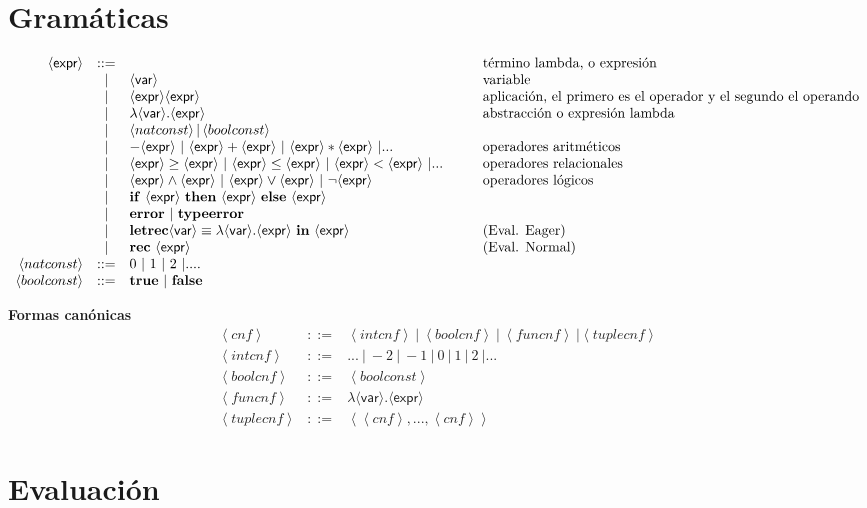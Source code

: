 \documentclass[12pt,a4paper]{article}
\newcommand{\nonterminal}[1]{\langle \mathsf{#1} \rangle}
\newcommand{\expr}{\nonterminal{expr}}
\newcommand{\var}{\nonterminal{var}}
\newcommand{\la}{\left\langle }
\newcommand{\ra}{\right\rangle }
\newcommand{\cnf}{\left\langle cnf\right\rangle}
\newcommand{\ife}{\mathbf{if}\ }
\newcommand{\thene}{\ \mathbf{then}\ }
\newcommand{\elsee}{\ \mathbf{else}\ }
\newcommand{\natconst}{\left\langle natconst\right\rangle}
\newcommand{\boolconst}{\left\langle boolconst\right\rangle}
\newcommand{\intcnf}{\left\langle intcnf\right\rangle}
\newcommand{\boolcnf}{\left\langle boolcnf\right\rangle}
\newcommand{\funcnf}{\left\langle funcnf\right\rangle}
\newcommand{\tuplecnf}{\left\langle tuplecnf\right\rangle}
\begin{document}
  \section{Gramáticas}
    \[
      \begin{array}{rcl@{\hspace{1cm}}l}
        \expr &::= && \text{término lambda, o expresión} \\
            &|& \var & \text{variable} \\
            &|& \expr \expr & \text{aplicación, el primero es el operador y el segundo el operando} \\
            &|& \lambda \var.\expr & \text{abstracción o expresión lambda} \\
            &|& \natconst | \boolconst \\
            &|& -\expr \ |\ \expr + \expr  \ |\ \expr * \expr \ |... & \text{operadores aritméticos}\\
            &|& \expr\geq \expr  \ |\ \expr\leq \expr \ |\ \expr< \expr \ | ... & \text{operadores relacionales}\\
            &|& \expr\wedge \expr  \ |\ \expr\vee \expr \ |\ \neg\expr & \text{operadores lógicos} \\
            &|& \ife \expr\thene \expr\elsee \expr \\
            &|& \textbf{error}\ |\ \textbf{typeerror} \\
            &|& \textbf{letrec}\var \equiv \lambda \var.\expr\ \textbf{in}\ \expr&\text{(Eval. Eager)} \\
            &|& \textbf{rec}\ \expr& \text{(Eval. Normal)} \\
            \natconst & ::= & 0\ |\ 1\ |\ 2\ | .... \\
            \boolconst & ::= & \textbf{true}\ | \ \textbf{false}
      \end{array}
    \]

    \textbf{Formas canónicas}
    \[
      \begin{array}{llllll}
      \cnf & ::= & \intcnf\  |\  \boolcnf\ |\ \funcnf \ | \tuplecnf \\
      \intcnf & ::= & ...\ | \ -2\ | \ -1\ | \ 0\ |\ 1\ |\ 2\ | ... \\
      \boolcnf & ::= & \boolconst \\
      \funcnf & ::= & \lambda \var.\expr \\
      \tuplecnf & ::= & \la \la cnf \ra, ..., \la cnf \ra \ra
      \end{array}
    \]
  \section{Evaluación}
\end{document}
